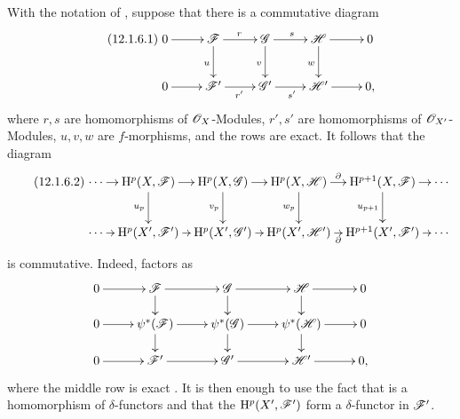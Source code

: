 \begin{remark}[12.1.6]
\label{0.12.1.6}
With the notation of , suppose that there is a
commutative diagram
\[
\label{0.12.1.6.1}
\tag{12.1.6.1}
  \xymatrix{
    0\ar[r] & \sh{F}\ar[r]^r\ar[d]_u
      & \sh{G}\ar[r]^s\ar[d]_v
      & \sh{H}\ar[r]\ar[d]_w & 0\\
    0\ar[r] & \sh{F}'\ar[r]_{r'}
      & \sh{G}'\ar[r]_{s'}
      & \sh{H}'\ar[r] & 0,
  }
\]
where $r,s$ are homomorphisms of $\mathscr{O}_X$-Modules,
$r',s'$ are homomorphisms of $\mathscr{O}_{X'}$-Modules,
$u,v,w$ are $f$-morphisms, and the rows are exact.
It follows that the diagram
\[
\label{0.12.1.6.2}
\tag{12.1.6.2}
  \xymatrix@C=6pt{
    \cdots\ar[r]
      & \HH^p(X,\sh{F})\ar[r]\ar[d]_{u_p}
      & \HH^p(X,\sh{G})\ar[r]\ar[d]_{v_p}
      & \HH^p(X,\sh{H})\ar[r]^-\partial\ar[d]_{w_p}
      & \HH^{p+1}(X,\sh{F})\ar[r]\ar[d]_{u_{p+1}}
      & \cdots\\
    \cdots\ar[r]
      & \HH^p(X',\sh{F}')\ar[r]
      & \HH^p(X',\sh{G}')\ar[r]
      & \HH^p(X',\sh{H}')\ar[r]_-\partial
      & \HH^{p+1}(X',\sh{F}')\ar[r]
      & \cdots
  }
\]
is commutative.
Indeed,  factors as
\[
  \xymatrix@R=14pt{
    0\ar[r] & \sh{F}\ar[r]\ar[d]
      & \sh{G}\ar[r]\ar[d]
      & \sh{H}\ar[r]\ar[d] & 0\\
    0\ar[r] & \psi^*(\sh{F})\ar[r]\ar[d]
      & \psi^*(\sh{G})\ar[r]\ar[d]
      & \psi^*(\sh{H})\ar[r]\ar[d] & 0\\
    0\ar[r] & \sh{F}'\ar[r]
      & \sh{G}'\ar[r]
      & \sh{H}'\ar[r] & 0,
  }
\]
where the middle row is exact
.
It is then enough to use the fact that  is a
homomorphism of $\delta$-functors and that the
$\mathrm{H}^p(X',\mathscr{F}')$ form a $\delta$-functor in $\mathscr{F}'$.
\end{remark}


